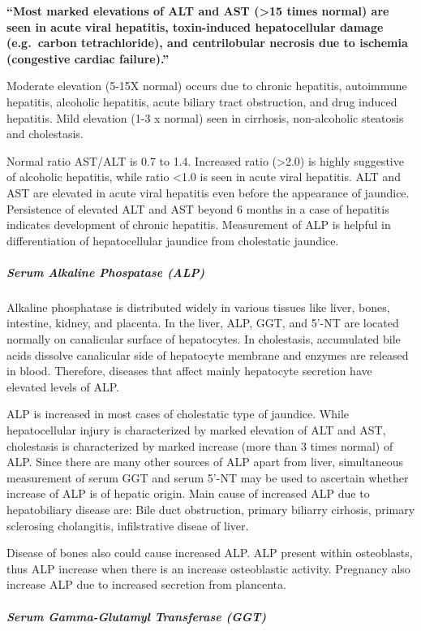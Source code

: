 \documentclass[
  letterpaper,
  DIV=11,
  numbers=noendperiod]{scrreprt}
\let\oldsubparagraph\subparagraph
\renewcommand{\subparagraph}[1]{\oldsubparagraph{#1}\mbox{}}
\begin{document}
\textbf{``Most marked elevations of ALT and AST (\textgreater15 times
normal) are seen in acute viral hepatitis, toxin-induced hepatocellular
damage (e.g.~carbon tetrachloride), and centrilobular necrosis due to
ischemia (congestive cardiac failure).''}

Moderate elevation (5-15X normal) occurs due to chronic hepatitis,
autoimmune hepatitis, alcoholic hepatitis, acute biliary tract
obstruction, and drug induced hepatitis. Mild elevation (1-3 x normal)
seen in cirrhosis, non-alcoholic steatosis and cholestasis.

Normal ratio AST/ALT is 0.7 to 1.4. Increased ratio (\textgreater2.0) is
highly suggestive of alcoholic hepatitis, while ratio \textless1.0 is
seen in acute viral hepatitis. ALT and AST are elevated in acute viral
hepatitis even before the appearance of jaundice. Persistence of
elevated ALT and AST beyond 6 months in a case of hepatitis indicates
development of chronic hepatitis. Measurement of ALP is helpful in
differentiation of hepatocellular jaundice from cholestatic jaundice.

\subparagraph{Serum Alkaline Phospatase
(ALP)}\label{serum-alkaline-phospatase-alp}

Alkaline phosphatase is distributed widely in various tissues like
liver, bones, intestine, kidney, and placenta. In the liver, ALP, GGT,
and 5'-NT are located normally on canalicular surface of hepatocytes. In
cholestasis, accumulated bile acids dissolve canalicular side of
hepatocyte membrane and enzymes are released in blood. Therefore,
diseases that affect mainly hepatocyte secretion have elevated levels of
ALP.

ALP is increased in most cases of cholestatic type of jaundice. While
hepatocellular injury is characterized by marked elevation of ALT and
AST, cholestasis is characterized by marked increase (more than 3 times
normal) of ALP. Since there are many other sources of ALP apart from
liver, simultaneous measurement of serum GGT and serum 5'-NT may be used
to ascertain whether increase of ALP is of hepatic origin. Main cause of
increased ALP due to hepatobiliary disease are: Bile duct obstruction,
primary biliarry cirhosis, primary sclerosing cholangitis, infilstrative
diseae of liver.

Disease of bones also could cause increased ALP. ALP present within
osteoblasts, thus ALP increase when there is an increase osteoblastic
activity. Pregnancy also increase ALP due to increased secretion from
plancenta.

\subparagraph{Serum Gamma-Glutamyl Transferase
(GGT)}\label{serum-gamma-glutamyl-transferase-ggt}
\end{document}
